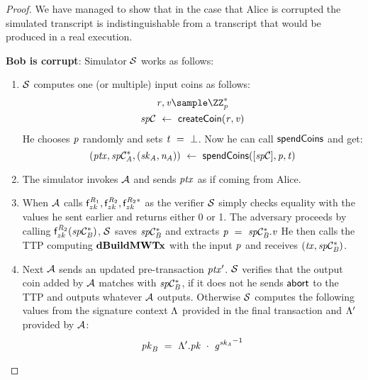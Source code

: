 \begin{proof}
    We have managed to show that in the case that Alice is corrupted the simulated transcript is indistinguishable from a transcript that would be produced in a real execution.

    \textbf{Bob is corrupt}: Simulator $\mathcal{S}$ works as follows:
    \begin{enumerate}
        \item $\mathcal{S}$ computes one (or multiple) input coins as follows:
        \begin{gather*}
            \varBlindingFactor, \varValue \sample \cnstIntegersPrimeWithoutZero{\varPrime} \\
            \varSpendableCoin \opFunResult \procCreateCoin{\varBlindingFactor}{\varValue}
        \end{gather*}
        He chooses $\mathit{p}$ randomly and sets $\mathit{t} ~=~ \bot$.
        Now he can call $\mathsf{spendCoins}$ and get:
        \[ (\mathit{ptx}, \mathit{sp}\mathcal{C}_{\mathit{A}}^*, (\mathit{sk}_{\mathit{A}}, \mathit{\mathit{n}_{\mathit{A}}})) ~\leftarrow~ \mathsf{spendCoins}([\mathit{sp}\mathcal{C}],\mathit{p},\mathit{t}) \]
        \item The simulator invokes $\mathcal{A}$ and sends $\mathit{ptx}$ as if coming from Alice.
        \item When $\mathcal{A}$ calls $\mathsf{f}^{\mathit{R}_1}_{zk},\mathsf{f}^{\mathit{R}_2}_{zk},\mathsf{f}^{\mathit{R}_2*}_{zk}$ as the verifier $\mathcal{S}$ simply checks equality with the values he sent earlier and returns either 0 or 1.
        The adversary proceeds by calling $\mathsf{f}^{\mathit{R}_2}_{zk}(\mathit{sp}\mathcal{C}_{\mathit{B}}^*)$, $\mathcal{S}$ saves $\mathit{sp}\mathcal{C}_{\mathit{B}}^*$ and extracts $\mathit{p} ~=~ \mathit{sp}\mathcal{C}_{\mathit{B}}^*.\mathit{v}$
        He then calls the TTP computing $\mathbf{dBuildMWTx}$ with the input $\mathit{p}$ and receives $(\mathit{tx}, \mathit{sp}\mathcal{C}_{\mathit{B}}^*)$.
        \item Next $\mathcal{A}$ sends an updated pre-transaction ${\mathit{ptx}}'$.
        $\mathcal{S}$ verifies that the output coin added by $\mathcal{A}$ matches with $\mathit{sp}\mathcal{C}_{\mathit{B}}^*$, if it does not he sends $\mathsf{abort}$ to the TTP and outputs whatever $\mathcal{A}$ outputs.
        Otherwise $\mathcal{S}$ computes the following values from the signature context $\Lambda$ provided in the final transaction and ${\Lambda}'$ provided by $\mathcal{A}$:
        \begin{gather*}
            \varPubKeyBob \opEqNoQ \funStarAlt{\varSigContext}.\varPubKey \opAddPoint {\funGen{\varSecKeyAlice}}^{-1} \\

\end{gather*}
\end{enumerate}
\end{proof}
